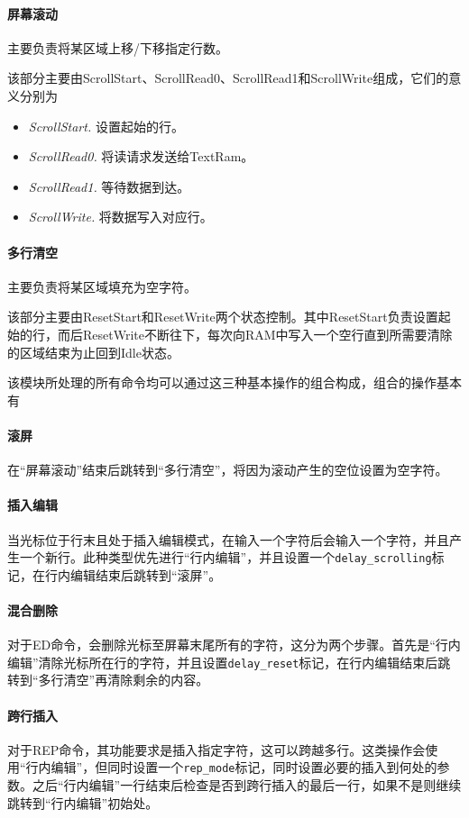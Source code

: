 \paragraph{屏幕滚动}
主要负责将某区域上移/下移指定行数。

该部分主要由ScrollStart、ScrollRead0、ScrollRead1和ScrollWrite组成，它们的意义分别为

\begin{itemize}
	\item \textit{ScrollStart.} 设置起始的行。
	\item \textit{ScrollRead0.} 将读请求发送给TextRam。
	\item \textit{ScrollRead1.} 等待数据到达。
	\item \textit{ScrollWrite.} 将数据写入对应行。
\end{itemize}

\paragraph{多行清空}
主要负责将某区域填充为空字符。

该部分主要由ResetStart和ResetWrite两个状态控制。其中ResetStart负责设置起始的行，而后ResetWrite不断往下，每次向RAM中写入一个空行直到所需要清除的区域结束为止回到Idle状态。

该模块所处理的所有命令均可以通过这三种基本操作的组合构成，组合的操作基本有

\paragraph{滚屏}
在``屏幕滚动''结束后跳转到``多行清空''，将因为滚动产生的空位设置为空字符。

\paragraph{插入编辑}
当光标位于行末且处于插入编辑模式，在输入一个字符后会输入一个字符，并且产生一个新行。此种类型优先进行``行内编辑''，并且设置一个\texttt{delay\_scrolling}标记，在行内编辑结束后跳转到``滚屏''。

\paragraph{混合删除}
对于ED命令，会删除光标至屏幕末尾所有的字符，这分为两个步骤。首先是``行内编辑''清除光标所在行的字符，并且设置\texttt{delay\_reset}标记，在行内编辑结束后跳转到``多行清空''再清除剩余的内容。
\paragraph{跨行插入}
对于REP命令，其功能要求是插入指定字符，这可以跨越多行。这类操作会使用``行内编辑''，但同时设置一个\texttt{rep\_mode}标记，同时设置必要的插入到何处的参数。之后``行内编辑''一行结束后检查是否到跨行插入的最后一行，如果不是则继续跳转到``行内编辑''初始处。

